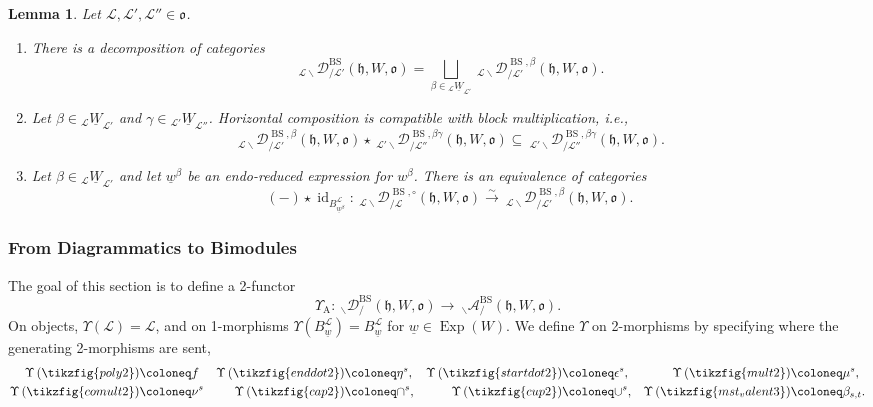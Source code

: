 \documentclass{amsart}
\newcommand{\scrL}{\mathcal{L}}
\DeclareMathOperator{\id}{id}
\newcommand{\fr}[1]{\mathfrak{#1}}
\DeclareMathOperator{\Abe}{A}
\DeclareMathOperator{\BS}{BS}
\newcommand{\EWmon}[2]{\:_{#1 \backslash} \mathcal{D}_{/ #2} }
\newcommand{\Amon}[2]{\:_{#1 \backslash} \mathcal{A}_{/ #2} }
\DeclareMathOperator{\Exp}{Exp}
\newcommand{\uW}[2]{{}_{#1}\underline{W}_{#2}}
\newcommand{\uw}{\underline{w}}
\newtheorem{lemma}[subsubsection]{Lemma}
\theoremstyle{definition}
\numberwithin{equation}{subsection}
\begin{document}
    \begin{lemma}\label{lem:diag_block_props}
        Let $\scrL, \scrL', \scrL'' \in \fr{o}$.
    \begin{enumerate}
        \item There is a decomposition of categories
    \[\EWmon{\scrL}{\scrL'}^{\BS} (\fr{h}, W, \fr{o}) = \bigsqcup_{\beta \in \uW{\scrL}{\scrL'}} \EWmon{\scrL}{\scrL'}^{\BS, \beta} (\fr{h}, W, \fr{o}).\]
        \item Let $\beta \in \uW{\scrL}{\scrL'}$ and $\gamma \in \uW{\scrL'}{\scrL''}$. Horizontal composition is compatible with block multiplication, i.e.,
        \[\EWmon{\scrL}{\scrL'}^{\BS, \beta} (\fr{h}, W, \fr{o}) \star \EWmon{\scrL'}{\scrL''}^{\BS, \beta \gamma} (\fr{h}, W, \fr{o}) \subseteq \EWmon{\scrL'}{\scrL''}^{\BS, \beta \gamma} (\fr{h}, W, \fr{o}).\]
        \item Let $\beta \in \uW{\scrL}{\scrL'}$ and let $\uw^{\beta}$ be an endo-reduced expression for $w^{\beta}$. There is an equivalence of categories
        \[ (-) \star \id_{B_{\uw^{\beta}}^{\scrL}} : \EWmon{\scrL}{\scrL}^{\BS, \circ} (\fr{h}, W, \fr{o})  \stackrel{\sim}{\to} \EWmon{\scrL}{\scrL'}^{\BS, \beta} (\fr{h}, W, \fr{o}).\]
    \end{enumerate}
    \end{lemma}

\subsubsection{From Diagrammatics to Bimodules}

The goal of this section is to define a 2-functor 
\[\Upsilon_{\Abe} : \EWmon{}{}^{\BS} (\fr{h}, W, \fr{o}) \to \Amon{}{}^{\BS} (\fr{h}, W, \fr{o}).\]
On objects, $\Upsilon (\scrL) = \scrL$, and on 1-morphisms $\Upsilon (B_{\uw}^{\scrL}) = B_{\uw}^{\scrL}$ for $\uw \in \Exp (W)$.
We define $\Upsilon$ on 2-morphisms by specifying where the generating 2-morphisms are sent,
\begin{align*}
    \Upsilon \left( \tikzfig{poly2} \right) &\coloneq  f & \Upsilon \left(\tikzfig{enddot2} \right) &\coloneq \eta^s , & \Upsilon \left(\tikzfig{startdot2} \right) &\coloneq \epsilon^s,  & \Upsilon \left(\tikzfig{mult2} \right) &\coloneq  \mu^s, \\
    \Upsilon \left(\tikzfig{comult2} \right) &\coloneq \nu^s  & \Upsilon \left(\tikzfig{cap2} \right) &\coloneq \cap^s , & \Upsilon \left(\tikzfig{cup2} \right) &\coloneq  \cup^s, & \Upsilon \left( \tikzfig{mst_valent3} \right) &\coloneq \beta_{s,t}.   
\end{align*}
\end{document}
